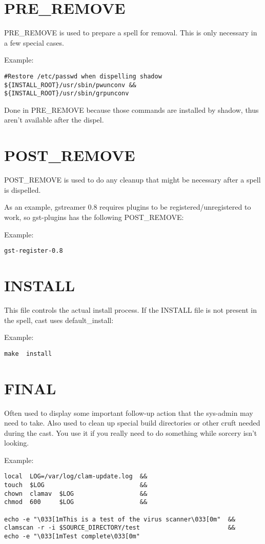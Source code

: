 \documentclass[a4paper,10pt]{book}
\begin{document}
\section{PRE\_REMOVE}
PRE\_REMOVE is used to prepare a spell for removal. This is only necessary in a
few special cases.

Example:
\begin{verbatim}
#Restore /etc/passwd when dispelling shadow
${INSTALL_ROOT}/usr/sbin/pwunconv &&
${INSTALL_ROOT}/usr/sbin/grpunconv
\end{verbatim}

Done in PRE\_REMOVE because those commands are installed by shadow, thus aren't
available after the dispel.

\section{POST\_REMOVE}
POST\_REMOVE is used to do any cleanup that might be necessary after a spell is
dispelled.

As an example, gstreamer 0.8 requires plugins to be registered/unregistered to
work, so gst-plugins has the following POST\_REMOVE:

Example:
\begin{verbatim}
gst-register-0.8
\end{verbatim}

\section{INSTALL}
This file controls the actual install process.  If the INSTALL file is not
present in the spell, cast uses default\_install:

Example:
\begin{verbatim}
make  install
\end{verbatim}


\section{FINAL}
Often used to display some important follow-up action that the sys-admin may
need to take. Also used to clean up special build directories or other cruft
needed during the cast. You use it if you really need to do something while
sorcery isn't looking.

Example:
\begin{verbatim}
local  LOG=/var/log/clam-update.log  &&
touch  $LOG                          &&
chown  clamav  $LOG                  &&
chmod  600     $LOG                  &&

echo -e "\033[1mThis is a test of the virus scanner\033[0m"  &&
clamscan -r -i $SOURCE_DIRECTORY/test                        &&
echo -e "\033[1mTest complete\033[0m"
\end{verbatim}
\end{document}
